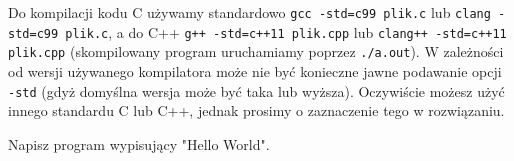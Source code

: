 % 
% 
% 
% 


\dbEntryCheckResults
	Do kompilacji kodu C używamy standardowo \Verb#gcc -std=c99 plik.c# lub \Verb#clang -std=c99 plik.c#, a do C++ \Verb#g++ -std=c++11 plik.cpp# lub \Verb#clang++ -std=c++11 plik.cpp# (skompilowany program uruchamiamy poprzez \Verb#./a.out#).
	W zależności od wersji używanego kompilatora może nie być konieczne jawne podawanie opcji \Verb#-std# (gdyż domyślna wersja może być taka lub wyższa).
	Oczywiście możesz użyć innego standardu C lub C++, jednak prosimy o zaznaczenie tego w rozwiązaniu.
\fi


\dbEntryCheckResults
Napisz program wypisujący "Hello World".
\fi

